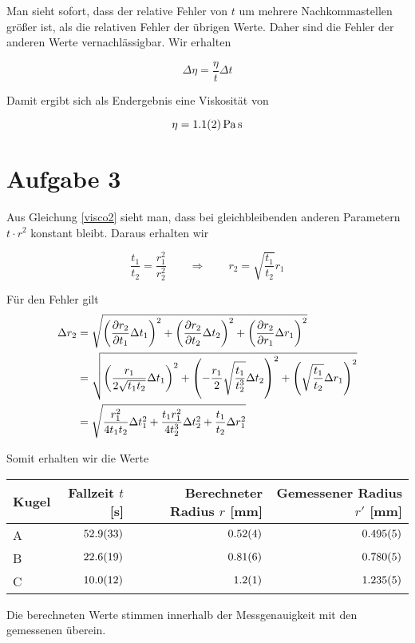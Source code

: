 \documentclass[a4paper,german,12pt,smallheadings]{scrartcl}
\begin{document}
Man sieht sofort, dass der relative Fehler von $t$ um mehrere Nachkommastellen
größer ist, als die relativen Fehler der übrigen Werte. Daher sind die Fehler
der anderen Werte vernachlässigbar. Wir erhalten

\begin{equation}
  \Delta \eta = \frac{\eta}{t} \Delta t
\end{equation}

Damit ergibt sich als Endergebnis eine Viskosität von

\begin{equation*}
  \eta = \SI{1.1+-0.2}{\pascal \second}
\end{equation*}


\section*{Aufgabe 3}

Aus Gleichung \ref{visco2} sieht man, dass bei gleichbleibenden anderen
Parametern $t \cdot r^2$ konstant bleibt. Daraus erhalten wir

\begin{equation}
  \frac{t_1}{t_2} = \frac{r_1^2}{r_2^2} \qquad \Rightarrow \qquad r_2 = \sqrt{\frac{t_1}{t_2}} r_1
\end{equation}

Für den Fehler gilt
\begin{align*}
  \Delta r_2 &= \sqrt{
    \del{\frac{\partial r_2}{\partial t_1} \Delta t_1}^2 +
    \del{\frac{\partial r_2}{\partial t_2} \Delta t_2}^2 +
    \del{\frac{\partial r_2}{\partial r_1} \Delta r_1}^2
  } \\
  &= \sqrt{
    \del{ \frac{r_1}{2 \sqrt{t_1 t_2}} \Delta t_1 }^2 +
    \del{ -\frac{r_1}{2} \sqrt{ \frac{t_1}{t_2^3}} \Delta t_2 }^2 +
    \del{ \sqrt{ \frac{t_1}{t_2}} \Delta r_1 }^2
  } \\
  &= \sqrt{
    \frac{r_1^2}{4 t_1 t_2} \Delta t_1^2 + \frac{t_1 r_1^2}{4 t_2^3} \Delta t_2^2 + \frac{t_1}{t_2} \Delta r_1^2
  }
\end{align*}

Somit erhalten wir die Werte

\vspace{0.5cm}
\begin{tabular}{l|r|r|r}
  Kugel & Fallzeit $t$ [s] & Berechneter Radius $r$ [mm] & Gemessener Radius $r'$ [mm] \\
  \hline
  A & $\num{52.9+-3.3}$ & $\num{0.52+-0.04}$ & $\num{0.495+-0.005}$ \\
  B & $\num{22.6+-1.9}$ & $\num{0.81+-0.06}$ & $\num{0.780+-0.005}$ \\
  C & $\num{10.0+-1.2}$ & $\num{1.2+-0.1}$ & $\num{1.235+-0.005}$ \\
\end{tabular}
\vspace{0.5cm}

Die berechneten Werte stimmen innerhalb der Messgenauigkeit mit den
gemessenen überein.








\begin{landscape}
  
\end{landscape}
\end{document}
